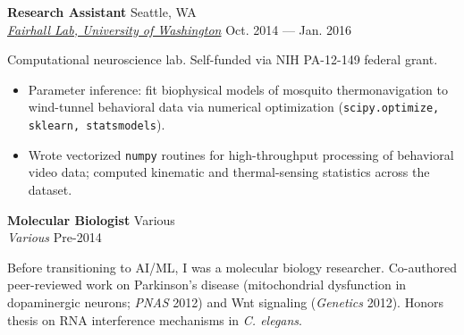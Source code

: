 \documentclass[a4paper,12pt]{article}
\newcommand{\ressubheading}[4]{{\begin{minipage}{\textwidth}
                                    \textbf{#1} \hfill #2 \\
                                    \textit{#3} \hfill #4 \\
\end{minipage}}}
\begin{document}


    \ressubheading{Research Assistant}{Seattle, WA}{\href{https://compneuro.washington.edu/}{Fairhall Lab, University of Washington}}{Oct. 2014 --- Jan. 2016}

    \vspace{-6pt} Computational neuroscience lab. Self-funded via NIH PA-12-149 federal grant.
    \begin{itemize}
        \item Parameter inference: fit biophysical models of mosquito thermonavigation to wind-tunnel behavioral data via numerical optimization (\texttt{scipy.optimize, sklearn, statsmodels}).
        \item Wrote vectorized \texttt{numpy} routines for high-throughput processing of behavioral video data; computed kinematic and thermal-sensing statistics across the dataset.
    \end{itemize}


    \ressubheading{Molecular Biologist}{Various}{Various}{Pre-2014}

    \vspace{-6pt} Before transitioning to AI/ML, I was a molecular biology researcher. Co-authored peer-reviewed work on Parkinson's disease (mitochondrial dysfunction in dopaminergic neurons; \textit{PNAS} 2012) and Wnt signaling (\textit{Genetics} 2012). Honors thesis on RNA interference mechanisms in \textit{C. elegans}.\\
\end{document}
